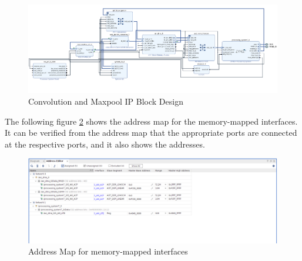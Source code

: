     \begin{figure}[H]
        \centering
        \includegraphics[width=1\linewidth]{images/convMaxBlockDesign.png}
        \caption{Convolution and Maxpool IP Block Design}
        \label{fig:convMaxBD}
    \end{figure}

    \noindent
    The following figure \ref{fig:addressMap} shows the address map for the memory-mapped interfaces. It can be verified from the address map that the appropriate ports are connected at the respective ports, and it also shows the addresses.

    \begin{figure}[H]
        \centering
        \includegraphics[width=1\linewidth]{images/addressMap.png}
        \caption{Address Map for memory-mapped interfaces}
        \label{fig:addressMap}
    \end{figure}
    \newpage
    